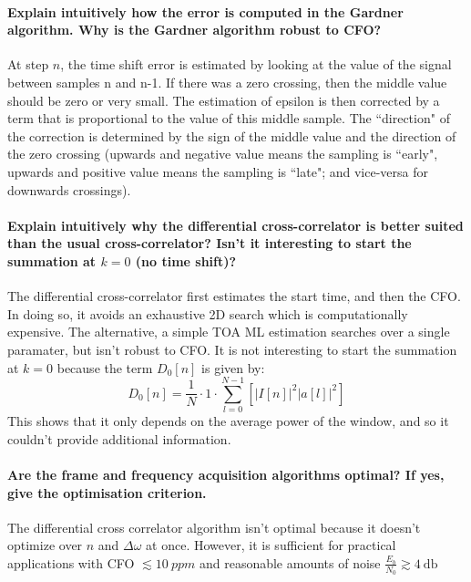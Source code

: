 \paragraph{Explain intuitively how the error is computed in the Gardner algorithm. Why is the
Gardner algorithm robust to CFO?} At step $n$, the time shift error is estimated by looking at the value of the signal between samples n and n-1. If there was a zero crossing, then the middle value should be zero or very small. The estimation of epsilon is then corrected by a term that is proportional to the value of this middle sample. The ``direction" of the correction is determined by the sign of the middle value and the direction of the zero crossing (upwards and negative value means the sampling is ``early", upwards and positive value means the sampling is ``late"; and vice-versa for downwards crossings).

\paragraph{Explain intuitively why the differential cross-correlator is better suited than the usual cross-correlator? Isn’t it interesting to start the summation at $k = 0$ (no time shift)?}
The differential cross-correlator first estimates the start time, and then the CFO. In doing so, it avoids an exhaustive 2D search which is computationally expensive. The alternative, a simple TOA ML estimation searches over a single paramater, but isn't robust to CFO.
It is not interesting to start the summation at $k = 0$ because the term $D_0[n]$ is given by:
\[
D_0[n] = \frac{1}{N}\cdot1\cdot\sum_{l=0}^{N-1} \left [ \big | I[n] \big | ^2 \big | a[l] \big | ^2 \right ]
\]
This shows that it only depends on the average power of the window, and so it couldn't provide additional information.

\paragraph{Are the frame and frequency acquisition algorithms optimal? If yes, give the optimisation criterion.}
The differential cross correlator algorithm isn't optimal because it doesn't optimize over $n$ and $\Delta \omega$ at once. However, it is sufficient for practical applications with CFO $\lesssim \SI{10}{ppm}$ and reasonable amounts of noise $\frac{E_b}{N_0} \gtrsim \SI{4}{\decibel}$
